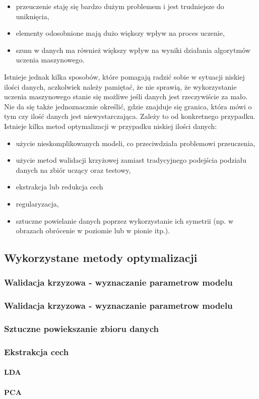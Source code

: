 \begin{itemize}
\item przeuczenie staję się bardzo dużym problemem i jest trudniejsze do uniknięcia,
\item elementy odosobnione mają dużo większy wpływ na proces uczenie,
\item szum w danych ma również większy wpływ na wyniki działania algorytmów uczenia maszynowego.
\end{itemize}
Istnieje jednak kilka sposobów, które pomagają radzić sobie w sytuacji niskiej ilości danych, aczkolwiek należy pamiętać, że nie sprawią, że wykorzystanie uczenia maszynowego stanie się możliwe jeśli danych jest rzeczywiście za mało. Nie da się także jednoznacznie określić, gdzie znajduje się granica, która mówi o tym czy ilość danych jest niewystarczająca. Zależy to od konkretnego przypadku. Istnieje kilka metod optymalizacji w przypadku niskiej ilości danych:
\begin{itemize}
\item użycie nieskomplikowanych modeli, co przeciwdziała problemowi przeuczenia,
\item użycie metod walidacji krzyżowej zamiast tradycyjnego podejścia podziału danych na zbiór uczący oraz testowy,
\item ekstrakcja lub redukcja cech
\item regularyzacja,
\item sztuczne powielanie danych poprzez wykorzystanie ich symetrii (np. w obrazach obrócenie w poziomie lub w pionie itp.).
\end{itemize}


\subsection{Wykorzystane metody optymalizacji}
\subsubsection{Walidacja krzyzowa - wyznaczanie parametrow modelu}
\subsubsection{Walidacja krzyzowa - wyznaczanie parametrow modelu}
\subsubsection{Sztuczne powiekszanie zbioru danych}
\subsubsection{Ekstrakcja cech}
\paragraph{LDA}
\paragraph{PCA}

